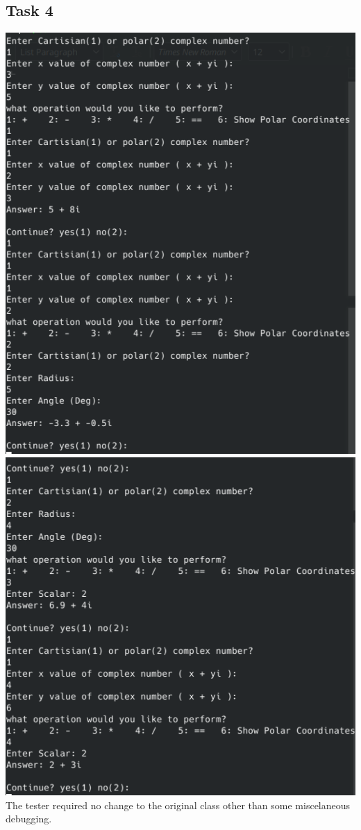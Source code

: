\documentclass[11pt]{article}
\begin{document}
\subsection{Task 4}
\includegraphics[scale=0.7]{first}
\includegraphics[scale=0.6]{second}
The tester required no change to the original class other than some miscelaneous debugging.
\end{document}
